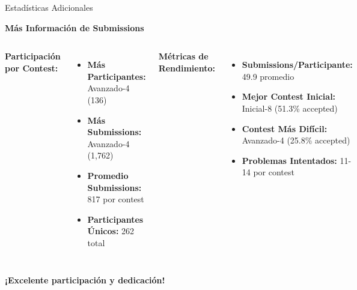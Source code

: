 \documentclass{beamer}
\begin{document}
\begin{frame}{Estadísticas Adicionales}
\begin{center}
\Large
\textbf{Más Información de Submissions}

\vspace{0.3cm}

\begin{columns}[t]
\textbf{Participación por Contest:}

\vspace{0.1cm}

\small
\begin{itemize}
\item \textbf{Más Participantes:} Avanzado-4 (136)
\item \textbf{Más Submissions:} Avanzado-4 (1,762)
\item \textbf{Promedio Submissions:} 817 por contest
\item \textbf{Participantes Únicos:} 262 total
\end{itemize}

\textbf{Métricas de Rendimiento:}

\vspace{0.1cm}

\small
\begin{itemize}
\item \textbf{Submissions/Participante:} 49.9 promedio
\item \textbf{Mejor Contest Inicial:} Inicial-8 (51.3\% accepted)
\item \textbf{Contest Más Difícil:} Avanzado-4 (25.8\% accepted)
\item \textbf{Problemas Intentados:} 11-14 por contest
\end{itemize}
\end{columns}

\vspace{0.3cm}

\textbf{¡Excelente participación y dedicación!}
\end{center}
\end{frame}
\end{document}
